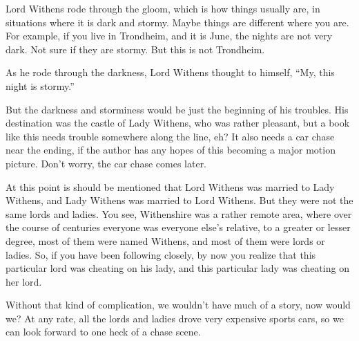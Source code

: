 \documentclass{novelette}
\begin{document}
\begin{opening}
\null\null\null\null\null\null
{}
\null\null\null\null\null
\end{opening}
 Lord Withens rode through the gloom,
which is how things usually are, in situations where it is dark and stormy.
Maybe things are different where you are. For example, if you live in
Trondheim, and it is June, the nights are not very dark. Not sure if they
are stormy. But this is not Trondheim.

As he rode through the darkness, Lord Withens thought to himself,
``My, this night is stormy.''

But the darkness and storminess would be just the beginning of his troubles.
His destination was the castle of Lady Withens, who was rather pleasant,
but a book like this needs trouble somewhere along the line, eh? It also
needs a car chase near the ending, if the author has any hopes of this
becoming a major motion picture. Don't worry, the car chase comes later.

At this point is should be mentioned that Lord Withens was married to Lady
Withens, and Lady Withens was married to Lord Withens. But they were not
the same lords and ladies. You see, Withenshire was a rather remote area,
where over the course of centuries everyone was everyone else's relative,
to a greater or lesser degree, most of them were named Withens, and most
of them were lords or ladies. So, if you have been following closely,
by now you realize that this particular lord was cheating on his lady,
and this particular lady was cheating on her lord.

Without that kind of complication, we wouldn't have much of a story,
now would we? At any rate, all the lords and ladies drove very expensive
sports cars, so we can look forward to one heck of a chase scene.
\end{document}
